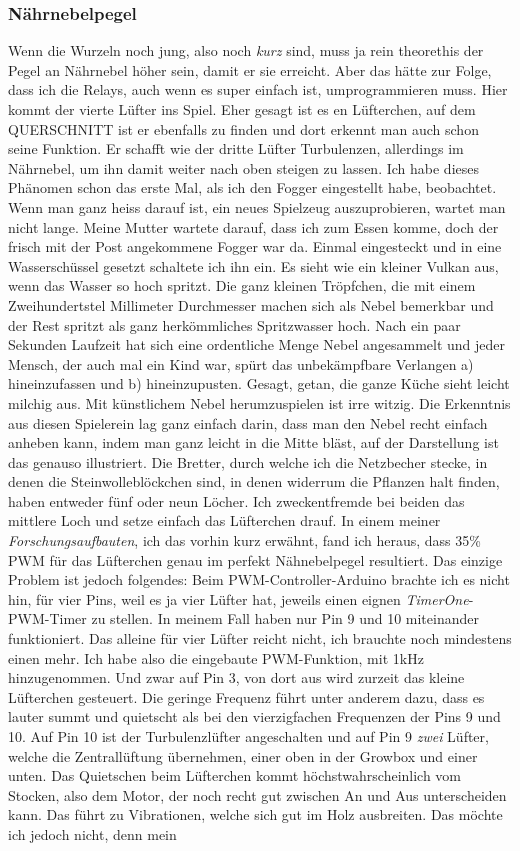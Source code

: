 \documentclass[12pt,titlepage,a4paper]{article}
\begin{document}
\subsubsection{Nährnebelpegel}
Wenn die Wurzeln noch jung, also noch \textit{kurz} sind, muss ja rein theorethis der Pegel an Nährnebel höher sein, damit er sie erreicht. Aber das hätte zur Folge, dass ich die Relays, auch wenn es super einfach ist, umprogrammieren muss. Hier kommt der vierte Lüfter ins Spiel. Eher gesagt ist es en Lüfterchen, auf dem QUERSCHNITT ist er ebenfalls zu finden und dort erkennt man auch schon seine Funktion. Er schafft wie der dritte Lüfter Turbulenzen, allerdings im Nährnebel, um ihn damit weiter nach oben steigen zu lassen. Ich habe dieses Phänomen schon das erste Mal, als ich den Fogger eingestellt habe, beobachtet. Wenn man ganz heiss darauf ist, ein neues Spielzeug auszuprobieren, wartet man nicht lange. Meine Mutter wartete darauf, dass ich zum Essen komme, doch der frisch mit der Post angekommene Fogger war da. Einmal eingesteckt und in eine Wasserschüssel gesetzt schaltete ich ihn ein. Es sieht wie ein kleiner Vulkan aus, wenn das Wasser so hoch spritzt. Die ganz kleinen Tröpfchen, die mit einem Zweihundertstel Millimeter Durchmesser machen sich als Nebel bemerkbar und der Rest spritzt als ganz herkömmliches Spritzwasser hoch. Nach ein paar Sekunden Laufzeit hat sich eine ordentliche Menge Nebel angesammelt und jeder Mensch, der auch mal ein Kind war, spürt das unbekämpfbare Verlangen a) hineinzufassen und b) hineinzupusten. Gesagt, getan, die ganze Küche sieht leicht milchig aus. Mit künstlichem Nebel herumzuspielen ist irre witzig. Die Erkenntnis aus diesen Spielerein lag ganz einfach darin, dass man den Nebel recht einfach anheben kann, indem man ganz leicht in die Mitte bläst, auf der Darstellung ist das genauso illustriert. Die Bretter, durch welche ich die Netzbecher stecke, in denen die Steinwolleblöckchen sind, in denen widerrum die Pflanzen halt finden, haben entweder fünf oder neun Löcher. Ich zweckentfremde  bei beiden das mittlere Loch und setze einfach das Lüfterchen drauf. In einem meiner \textit{Forschungsaufbauten}, ich das vorhin kurz erwähnt, fand ich heraus, dass 35\% PWM für das Lüfterchen genau im perfekt Nähnebelpegel resultiert. Das einzige Problem ist jedoch folgendes: Beim PWM-Controller-Arduino brachte ich es nicht hin, für vier Pins, weil es ja vier Lüfter hat, jeweils einen eignen \textit{TimerOne}-PWM-Timer zu stellen. In meinem Fall haben nur Pin 9 und 10 miteinander funktioniert. Das alleine für vier Lüfter reicht nicht, ich brauchte noch mindestens einen mehr. Ich habe also die eingebaute PWM-Funktion, mit 1kHz hinzugenommen. Und zwar auf Pin 3, von dort aus wird zurzeit das kleine Lüfterchen gesteuert. Die geringe Frequenz führt unter anderem dazu, dass es lauter summt und quietscht als bei den vierzigfachen Frequenzen der Pins 9 und 10. Auf Pin 10 ist der Turbulenzlüfter angeschalten und auf Pin 9 \textit{zwei} Lüfter, welche die Zentrallüftung übernehmen, einer oben in der Growbox und einer unten. Das Quietschen beim Lüfterchen kommt höchstwahrscheinlich vom Stocken, also dem Motor, der noch recht gut zwischen An und Aus unterscheiden kann. Das führt zu Vibrationen, welche sich gut im Holz ausbreiten. Das möchte ich jedoch nicht, denn mein 
\end{document}
